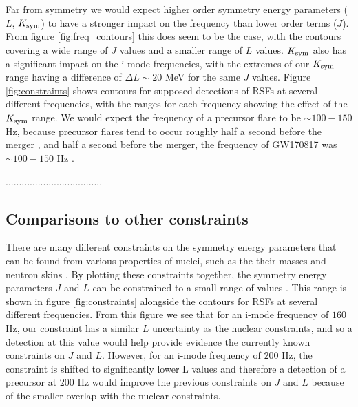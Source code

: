 \documentclass[fleqn,usenatbib]{mnras}
\begin{document}
\iffalse
Far from symmetry we would expect higher order symmetry energy parameters ($L$, $K_{\rm sym}$) to have a stronger impact on the frequency than lower order terms ($J$). From figure \ref{fig:freq_contours} this does seem to be the case, with the contours covering a wide range of $J$ values and a smaller range of $L$ values. $K_{\rm sym}$ also has a significant impact on the i-mode frequencies, with the extremes of our $K_{\rm sym}$ range having a difference of $\Delta L\sim 20$ MeV for the same $J$ values. Figure \ref{fig:constraints} shows contours for supposed detections of RSFs at several different frequencies, with the ranges for each frequency showing the effect of the $K_{\rm sym}$ range. We would expect the frequency of a precursor flare to be $\sim 100-150$ Hz, because precursor flares tend to occur roughly half a second before the merger \citet{zhong2019precursors}, and half a second before the merger, the frequency of GW170817 was $\sim 100-150$ Hz \citet{abbott2017merger}.

....................................







\subsection{Comparisons to other constraints}
There are many different constraints on the symmetry energy parameters that can be found from various properties of nuclei, such as the their masses \citet{kortelainen2010nuclear} and neutron skins \citet{chen2010density}. By plotting these constraints together, the symmetry energy parameters $J$ and $L$ can be constrained to a small range of values \citet{lattimer2013constraining}. This range is shown in figure \ref{fig:constraints} alongside the contours for RSFs at several different frequencies. From this figure we see that for an i-mode frequency of $160$ Hz, our constraint has a similar $L$ uncertainty as the nuclear constraints, and so a detection at this value would help provide evidence the currently known constraints on $J$ and $L$. However, for an i-mode frequency of $200$ Hz, the constraint is shifted to significantly lower L values and therefore a detection of a precursor at $200$ Hz would improve the previous constraints on $J$ and $L$ because of the smaller overlap with the nuclear constraints. %
\end{document}
